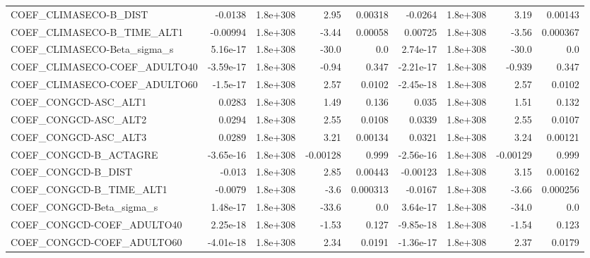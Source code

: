 \begin{tabular}{lrrrrrrrr}
COEF\_CLIMASECO-B\_DIST             &     -0.0138 &     1.8e+308 &      2.95 &  0.00318 &    -0.0264 &    1.8e+308 &         3.19 &       0.00143 \\
COEF\_CLIMASECO-B\_TIME\_ALT1        &    -0.00994 &     1.8e+308 &     -3.44 &  0.00058 &    0.00725 &    1.8e+308 &        -3.56 &      0.000367 \\
COEF\_CLIMASECO-Beta\_sigma\_s       &    5.16e-17 &     1.8e+308 &     -30.0 &      0.0 &   2.74e-17 &    1.8e+308 &        -30.0 &           0.0 \\
COEF\_CLIMASECO-COEF\_ADULTO40      &   -3.59e-17 &     1.8e+308 &     -0.94 &    0.347 &  -2.21e-17 &    1.8e+308 &       -0.939 &         0.347 \\
COEF\_CLIMASECO-COEF\_ADULTO60      &    -1.5e-17 &     1.8e+308 &      2.57 &   0.0102 &  -2.45e-18 &    1.8e+308 &         2.57 &        0.0102 \\
COEF\_CONGCD-ASC\_ALT1              &      0.0283 &     1.8e+308 &      1.49 &    0.136 &      0.035 &    1.8e+308 &         1.51 &         0.132 \\
COEF\_CONGCD-ASC\_ALT2              &      0.0294 &     1.8e+308 &      2.55 &   0.0108 &     0.0339 &    1.8e+308 &         2.55 &        0.0107 \\
COEF\_CONGCD-ASC\_ALT3              &      0.0289 &     1.8e+308 &      3.21 &  0.00134 &     0.0321 &    1.8e+308 &         3.24 &       0.00121 \\
COEF\_CONGCD-B\_ACTAGRE             &   -3.65e-16 &     1.8e+308 &  -0.00128 &    0.999 &  -2.56e-16 &    1.8e+308 &     -0.00129 &         0.999 \\
COEF\_CONGCD-B\_DIST                &      -0.013 &     1.8e+308 &      2.85 &  0.00443 &   -0.00123 &    1.8e+308 &         3.15 &       0.00162 \\
COEF\_CONGCD-B\_TIME\_ALT1           &     -0.0079 &     1.8e+308 &      -3.6 & 0.000313 &    -0.0167 &    1.8e+308 &        -3.66 &      0.000256 \\
COEF\_CONGCD-Beta\_sigma\_s          &    1.48e-17 &     1.8e+308 &     -33.6 &      0.0 &   3.64e-17 &    1.8e+308 &        -34.0 &           0.0 \\
COEF\_CONGCD-COEF\_ADULTO40         &    2.25e-18 &     1.8e+308 &     -1.53 &    0.127 &  -9.85e-18 &    1.8e+308 &        -1.54 &         0.123 \\
COEF\_CONGCD-COEF\_ADULTO60         &   -4.01e-18 &     1.8e+308 &      2.34 &   0.0191 &  -1.36e-17 &    1.8e+308 &         2.37 &        0.0179 \\

\end{tabular}
